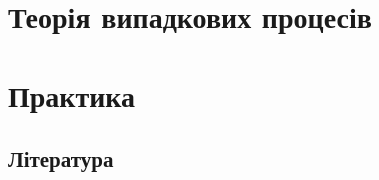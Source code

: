\documentclass[a4paper,12pt,ukrainian,oneside]{book}
\begin{document}
\tableofcontents
{}
\chapter{Теорія випадкових процесів}













\chapter{Практика}





\section{Література}
\end{document}
